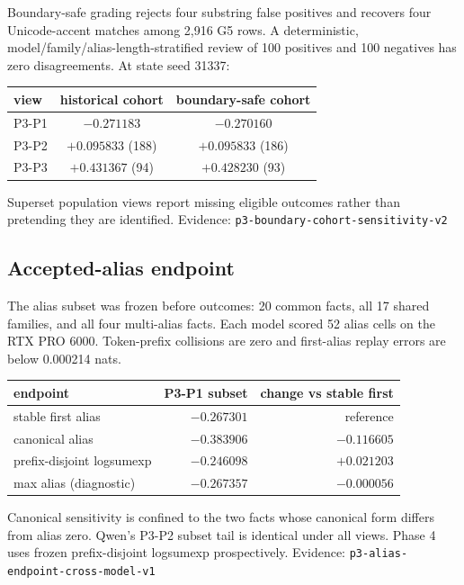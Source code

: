 \documentclass[10pt]{article}
\newcommand{\eid}[1]{\newline\textcolor{muted}{\footnotesize
Evidence: \nolinkurl{#1}}}
\begin{document}
Boundary-safe grading rejects four substring false positives and recovers
four Unicode-accent matches among 2,916 G5 rows. A deterministic,
model/family/alias-length-stratified review of 100 positives and 100
negatives has zero disagreements. At state seed 31337:

\begin{center}\small
\begin{tabular}{lcc}
\toprule
view & historical cohort & boundary-safe cohort\\
\midrule
P3-P1 & $-0.271183$ & $-0.270160$\\
P3-P2 & $+0.095833$ (188) & $+0.095833$ (186)\\
P3-P3 & $+0.431367$ (94) & $+0.428230$ (93)\\
\bottomrule
\end{tabular}
\end{center}

Superset population views report missing eligible outcomes rather than
pretending they are identified.
\eid{p3-boundary-cohort-sensitivity-v2}

\subsection{Accepted-alias endpoint}

The alias subset was frozen before outcomes: 20 common facts, all 17
shared families, and all four multi-alias facts. Each model scored 52
alias cells on the RTX PRO 6000. Token-prefix collisions are zero and
first-alias replay errors are below 0.000214 nats.

\begin{center}\small
\begin{tabular}{lrr}
\toprule
endpoint & P3-P1 subset & change vs stable first\\
\midrule
stable first alias & $-0.267301$ & reference\\
canonical alias & $-0.383906$ & $-0.116605$\\
prefix-disjoint logsumexp & $-0.246098$ & $+0.021203$\\
max alias (diagnostic) & $-0.267357$ & $-0.000056$\\
\bottomrule
\end{tabular}
\end{center}

Canonical sensitivity is confined to the two facts whose canonical form
differs from alias zero. Qwen's P3-P2 subset tail is identical under all
views. Phase 4 uses frozen prefix-disjoint logsumexp prospectively.
\eid{p3-alias-endpoint-cross-model-v1}
\end{document}
